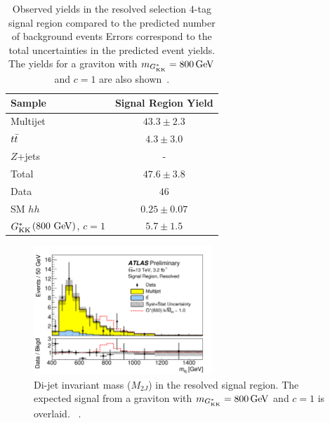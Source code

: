 \begin{table}[!ht]
\captionsetup{justification=centering}
\begin{center}
\begin{tabular}{ l c  }
\toprule
 Sample      & Signal Region Yield \\ 
\midrule
Multijet     & $43.3 \pm 2.3$   \\
$t\bar{t}$       &  $4.3 \pm 3.0$   \\
$Z$+jets     &  -           \\
\midrule
Total        & $47.6 \pm 3.8$   \\
 \midrule
Data         & $46$    \\
\midrule
SM $hh$ & $0.25 \pm 0.07$ \\
$G^*_{\rm KK}$$\left(800\,\rm{\GeV}\right)$, $c = 1$ & $5.7 \pm 1.5$ \\
\bottomrule
\end{tabular}
\caption{Observed yields in the resolved selection $4$-tag signal region compared to the predicted number of background events
  Errors correspond to the total uncertainties in the predicted event yields. The yields for a graviton with $m_{\Gkk} = 800\GeV$ and $c = 1$ are also shown~\cite{4bconf}.}
\label{tab:ResolvedResults} 
\end{center}
\end{table}

\begin{figure}[h!]
  \centering
  \captionsetup{justification=centering}

  \includegraphics[width=0.6\textwidth]{figures/Resolved_signal}


   \caption{Di-jet invariant mass ($M_{2J}$) in the resolved signal region. The expected signal from a graviton with $m_{\Gkk} = 800 \GeV$ and $c=1$ is overlaid. ~\cite{4bconf}.}
  \label{fig:ResolvedResults}
\end{figure}

